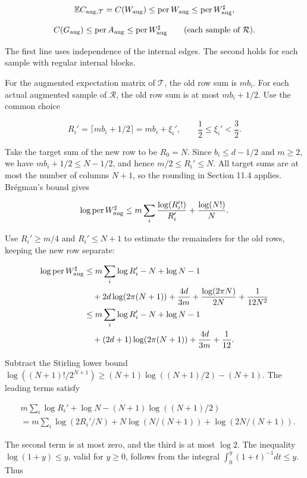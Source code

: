 \documentclass[11pt,a4paper]{article}
\begin{document}
\[
\mathbb EC_{{\rm aug},\mathcal T}
=C(W_{\rm aug})\le\operatorname{per}W_{\rm aug}
\le\operatorname{per}W^\sharp_{\rm aug},
\]

\[
C(G_{\rm aug})\le\operatorname{per}A_{\rm aug}
\le\operatorname{per}W^\sharp_{\rm aug}
\qquad(\text{each sample of }\mathcal R).
\]

The first line uses independence of the internal edges. The second holds for each sample with regular internal blocks.

For the augmented expectation matrix of \(\mathcal T\), the old row sum is \(mb_i\). For each actual augmented sample of \(\mathcal R\), the old row sum is at most \(mb_i+1/2\). Use the common choice

\[
R_i'=\lceil mb_i+1/2\rceil=mb_i+\xi_i',
\qquad \frac12\le\xi_i'<\frac32.
\]

Take the target sum of the new row to be \(R_0=N\). Since \(b_i\le d-1/2\) and \(m\ge2\), we have \(mb_i+1/2\le N-1/2\), and hence \(m/2\le R_i'\le N\). All target sums are at most the number of columns \(N+1\), so the rounding in Section 11.4 applies. Brégman's bound gives

\[
\log\operatorname{per}W^\sharp_{\rm aug}
\le m\sum_i\frac{\log(R_i'!)}{R_i'}
+\frac{\log(N!)}N.
\]

Use \(R_i'\ge m/4\) and \(R_i'\le N+1\) to estimate the remainders for the old rows, keeping the new row separate:

\[
\begin{aligned}
\log\operatorname{per}W^\sharp_{\rm aug}
&\le m\sum_i\log R_i'-N+\log N-1\\
&\quad+2d\log(2\pi(N+1))+\frac{4d}{3m}
+\frac{\log(2\pi N)}{2N}+\frac1{12N^2}\\
&\le m\sum_i\log R_i'-N+\log N-1\\
&\quad+(2d+1)\log(2\pi(N+1))+\frac{4d}{3m}+\frac1{12}.
\end{aligned}
\]

Subtract the Stirling lower bound \(\log((N+1)!/2^{N+1})\ge(N+1)\log((N+1)/2)-(N+1)\). The leading terms satisfy

\[
\begin{aligned}
&m\sum_i\log R_i'+\log N-(N+1)\log((N+1)/2)\\
&=m\sum_i\log(2R_i'/N)
+N\log(N/(N+1))+\log(2N/(N+1)).
\end{aligned}
\]

The second term is at most zero, and the third is at most \(\log2\). The inequality \(\log(1+y)\le y\), valid for \(y\ge0\), follows from the integral \(\int_0^y(1+t)^{-1}dt\le y\). Thus
\end{document}
